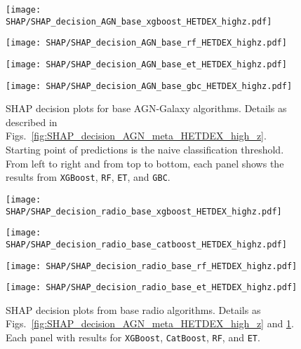\documentclass{aa}
\begin{document}
\begin{appendix}
\begin{figure}
  \centering
  \begin{minipage}{0.48\columnwidth}
    \centering
    \texttt{[image: SHAP/SHAP\_decision\_AGN\_base\_xgboost\_HETDEX\_highz.pdf]}
  \end{minipage}%
  \hfill
  \begin{minipage}{0.48\columnwidth}
    \centering
    \texttt{[image: SHAP/SHAP\_decision\_AGN\_base\_rf\_HETDEX\_highz.pdf]}
  \end{minipage}\break%
  \begin{minipage}{0.48\columnwidth}
    \centering
    \texttt{[image: SHAP/SHAP\_decision\_AGN\_base\_et\_HETDEX\_highz.pdf]}
  \end{minipage}%
  \hfill
  \begin{minipage}{0.48\columnwidth}
    \centering
    \texttt{[image: SHAP/SHAP\_decision\_AGN\_base\_gbc\_HETDEX\_highz.pdf]}
  \end{minipage}
  \caption{SHAP decision plots for base AGN-Galaxy algorithms. Details as described in Figs.~\ref{fig:SHAP_decision_AGN_meta_HETDEX_high_z}. Starting point of predictions is the naive classification threshold. From left to right and from top to bottom, each panel shows the results from \texttt{XGBoost}, \texttt{RF}, \texttt{ET}, and \texttt{GBC}.}
  \label{fig:SHAP_decision_AGN_base_HETDEX_high_z}
\end{figure}

\begin{figure}
  \centering
  \begin{minipage}{0.48\columnwidth}
    \centering
    \texttt{[image: SHAP/SHAP\_decision\_radio\_base\_xgboost\_HETDEX\_highz.pdf]}
  \end{minipage}%
  \hfill
  \begin{minipage}{0.48\columnwidth}
    \centering
    \texttt{[image: SHAP/SHAP\_decision\_radio\_base\_catboost\_HETDEX\_highz.pdf]}
  \end{minipage}\break%
  \begin{minipage}{0.48\columnwidth}
    \centering
    \texttt{[image: SHAP/SHAP\_decision\_radio\_base\_rf\_HETDEX\_highz.pdf]}
  \end{minipage}%
  \hfill
  \begin{minipage}{0.48\columnwidth}
    \centering
    \texttt{[image: SHAP/SHAP\_decision\_radio\_base\_et\_HETDEX\_highz.pdf]}
  \end{minipage}
  \caption{SHAP decision plots from base radio algorithms. Details as Figs.~\ref{fig:SHAP_decision_AGN_meta_HETDEX_high_z} and \ref{fig:SHAP_decision_AGN_base_HETDEX_high_z}. Each panel with results for \texttt{XGBoost}, \texttt{CatBoost}, \texttt{RF}, and \texttt{ET}.}
  \label{fig:SHAP_decision_radio_base_HETDEX_high_z}
\end{figure}


\end{appendix}
\end{document}
